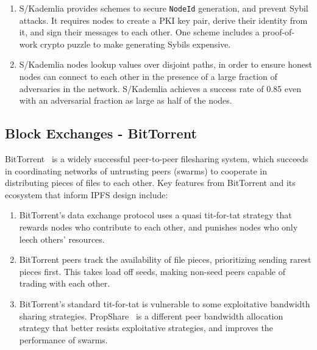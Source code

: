 \documentclass{sig-alternate}
\begin{document}
\begin{enumerate}

  \item S/Kademlia provides schemes to secure \texttt{NodeId} generation,
        and prevent Sybil attacks. It requires nodes to create a PKI key pair, derive their identity from it, and sign their messages to each other. One scheme includes a proof-of-work crypto puzzle to make generating Sybils expensive.

  \item S/Kademlia nodes lookup values over disjoint paths, in order to
        ensure honest nodes can connect to each other in the presence of a large fraction of adversaries in the network. S/Kademlia achieves a success rate of 0.85 even with an adversarial fraction as large as half of the nodes.

\end{enumerate}

\subsection{Block Exchanges - BitTorrent}

BitTorrent~\cite{cohen03} is a widely successful peer-to-peer filesharing system, which succeeds in coordinating networks of untrusting peers (swarms) to cooperate in distributing pieces of files to each other. Key features from BitTorrent and its ecosystem that inform IPFS design include:

\begin{enumerate}
  \item BitTorrent's data exchange protocol uses a quasi tit-for-tat strategy
        that rewards nodes who contribute to each other, and punishes nodes who only leech others' resources.

  \item BitTorrent peers track the availability of file pieces, prioritizing
        sending rarest pieces first. This takes load off seeds, making non-seed peers capable of trading with each other.

  \item BitTorrent's standard tit-for-tat is vulnerable to some exploitative
        bandwidth sharing strategies. PropShare~\cite{levin08} is a different peer bandwidth allocation strategy that better resists exploitative strategies, and improves the performance of swarms.

\end{enumerate}
\end{document}
